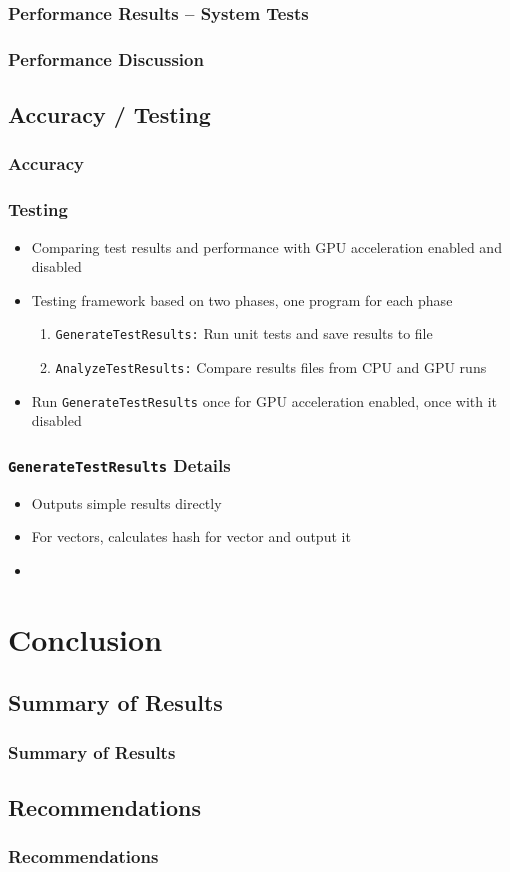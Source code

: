\documentclass{beamer}
\begin{document}
\begin{frame}
\frametitle{Performance Results -- System Tests}
\end{frame}

\begin{frame}
\frametitle{Performance Discussion}
\end{frame}

\subsection{Accuracy / Testing}
\begin{frame}
\frametitle{Accuracy}
\end{frame}

\begin{frame}
\frametitle{Testing}
\begin{itemize}
\item Comparing test results and performance with GPU acceleration enabled and disabled
\item Testing framework based on two phases, one program for each phase
\begin{enumerate}
\item \texttt{GenerateTestResults:} Run unit tests and save results to file
\item \texttt{AnalyzeTestResults:} Compare results files from CPU and GPU runs
\end{enumerate}
\item Run \texttt{GenerateTestResults} once for GPU acceleration enabled, once with it disabled
\end{itemize}
\end{frame}

\begin{frame}
\frametitle{\texttt{GenerateTestResults} Details}
\begin{itemize}
\item Outputs simple results directly
\item For vectors, calculates hash for vector and output it
\item 
\end{itemize}
\end{frame}

\section{Conclusion}
\subsection{Summary of Results}
\begin{frame}
\frametitle{Summary of Results}
\end{frame}

\subsection{Recommendations}
\begin{frame}
\frametitle{Recommendations}
\end{frame}
\end{document}

